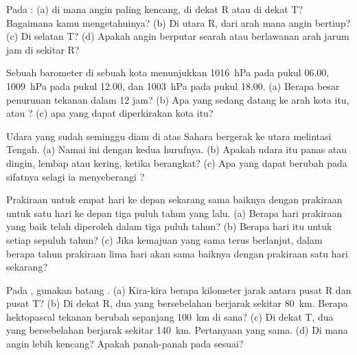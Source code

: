 \begin{exercise}[$\star\star$]\label{exo:g8:fronts-and-weather-maps:7}
Pada  : (a) di mana angin paling kencang, di dekat R atau di
dekat T? Bagaimana kamu mengetahuinya? (b) Di utara R, dari arah mana
angin bertiup? (c) Di selatan T? (d) Apakah angin berputar searah atau
berlawanan arah jarum jam di sekitar R?
\end{exercise}

\begin{exercise}[$\star\star$]\label{exo:g8:fronts-and-weather-maps:8}
Sebuah barometer di sebuah kota menunjukkan \qty{1016}{hPa} pada pukul
06.00, \qty{1009}{hPa} pada pukul 12.00, dan \qty{1003}{hPa} pada pukul
18.00. (a) Berapa besar penurunan tekanan dalam 12 jam? (b) Apa yang
sedang datang ke arah kota itu,  atau ? (c)  apa
yang dapat diperkirakan kota itu?
\end{exercise}

\begin{exercise}[$\star\star$]\label{exo:g8:fronts-and-weather-maps:9}
Udara yang sudah seminggu diam di atas Sahara bergerak ke utara melintasi
 Tengah. (a) Namai  ini dengan kedua hurufnya. (b) Apakah
udara itu panas atau dingin, lembap atau kering, ketika berangkat? (c) Apa
yang dapat berubah pada sifatnya selagi ia menyeberangi ?
\end{exercise}

\begin{exercise}[$\star\star$]\label{exo:g8:fronts-and-weather-maps:10}
Prakiraan untuk empat hari ke depan sekarang sama baiknya dengan prakiraan
untuk satu hari ke depan tiga puluh tahun yang lalu. (a) Berapa hari
prakiraan yang baik telah diperoleh dalam tiga puluh tahun? (b) Berapa
hari itu untuk setiap sepuluh tahun? (c) Jika kemajuan yang sama terus
berlanjut, dalam berapa tahun prakiraan lima hari akan sama baiknya
dengan prakiraan satu hari sekarang?
\end{exercise}

\begin{exercise}[$\star\star\star$]\label{exo:g8:fronts-and-weather-maps:11}
Pada  , gunakan batang . (a) Kira-kira berapa kilometer
jarak antara pusat R dan pusat T? (b) Di dekat R, dua  yang
bersebelahan berjarak sekitar \qty{80}{km}. Berapa hektopascal tekanan
berubah sepanjang \qty{100}{km} di sana? (c) Di dekat T, dua  yang
bersebelahan berjarak sekitar \qty{140}{km}. Pertanyaan yang sama. (d) Di
mana angin lebih kencang? Apakah panah-panah pada  sesuai?
\end{exercise}

